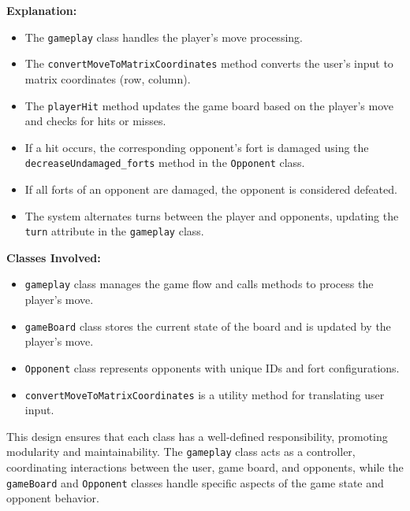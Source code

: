 \documentclass{article}
\begin{document}
\textbf{Explanation:}
\begin{itemize}
    \item The \texttt{gameplay} class handles the player's move processing.
    \item The \texttt{convertMoveToMatrixCoordinates} method converts the user's input to matrix coordinates (row, column).
    \item The \texttt{playerHit} method updates the game board based on the player's move and checks for hits or misses.
    \item If a hit occurs, the corresponding opponent's fort is damaged using the \texttt{decreaseUndamaged\_forts} method in the \texttt{Opponent} class.
    \item If all forts of an opponent are damaged, the opponent is considered defeated.
    \item The system alternates turns between the player and opponents, updating the \texttt{turn} attribute in the \texttt{gameplay} class.
\end{itemize}

\textbf{Classes Involved:}
\begin{itemize}
    \item \texttt{gameplay} class manages the game flow and calls methods to process the player's move.
    \item \texttt{gameBoard} class stores the current state of the board and is updated by the player's move.
    \item \texttt{Opponent} class represents opponents with unique IDs and fort configurations.
    \item \texttt{convertMoveToMatrixCoordinates} is a utility method for translating user input.
\end{itemize}

This design ensures that each class has a well-defined responsibility, promoting modularity and maintainability. The \texttt{gameplay} class acts as a controller, coordinating interactions between the user, game board, and opponents, while the \texttt{gameBoard} and \texttt{Opponent} classes handle specific aspects of the game state and opponent behavior.
\end{document}
